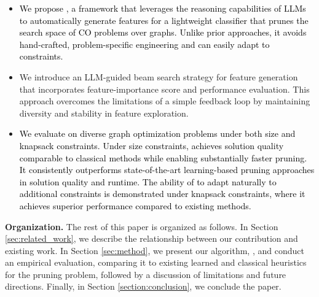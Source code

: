 \begin{itemize}
    \item \textcolor{black}{We propose \llm, a framework that leverages the reasoning capabilities of LLMs to automatically generate features for a lightweight classifier that prunes the search space of  \textcolor{black}{CO problems over graphs}. Unlike prior approaches, it avoids hand-crafted, problem-specific engineering and can easily adapt to constraints.}
    \item We introduce an LLM-guided beam search strategy for feature generation that incorporates feature-importance score and performance evaluation. This approach overcomes the limitations of a simple feedback loop by maintaining diversity and stability in feature exploration.
    \item \textcolor{black}{We evaluate \llm on diverse graph optimization problems under both size and knapsack constraints. Under size constraints, \llm achieves solution quality comparable to classical methods while enabling substantially faster pruning. It consistently outperforms state-of-the-art learning-based pruning approaches in solution quality and runtime. The ability of \llm to adapt naturally to additional constraints is demonstrated under knapsack constraints, where it achieves superior performance compared to existing methods.}
\end{itemize}

\textbf{Organization.} The rest of this paper is organized as follows. In Section \ref{sec:related_work}, we describe the relationship between our contribution and existing work. In Section \ref{sec:method}, we present our algorithm, \llm, and conduct an empirical evaluation, comparing it to existing learned and classical heuristics for the pruning problem, followed by a discussion of limitations and future directions. Finally, in Section \ref{section:conclusion}, we conclude the paper.


